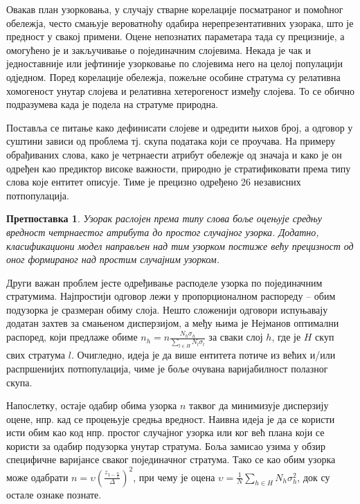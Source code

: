 \documentclass[a4paper]{article}
\newtheorem{hipoteza}{Претпоставка}
\begin{document}
Овакав план узорковања, у случају стварне корелације посматраног и помоћног обележја, често смањује вероватноћу одабира нерепрезентативних узорака, што је предност у свакој примени. Оцене непознатих параметара тада су прецизније, а омогућено је и закључивање о појединачним слојевима. Некада је чак и једноставније или јефтиније узорковање по слојевима него на целој популацији одједном. Поред корелације обележја, пожељне особине стратума су релативна хомогеност унутар слојева и релативна хетерогеност између слојева. То се обично подразумева када је подела на стратуме природна.

Поставља се питање како дефинисати слојеве и одредити њихов број, а одговор у суштини зависи од проблема тј. скупа података који се проучава. На примеру обрађиваних слова, како је четрнаести атрибут обележје од значаја и како је он одређен као предиктор високе важности, природно је стратификовати према типу слова које ентитет описује. Тиме је прецизно одређено 26 независних потпопулација.

\begin{hipoteza}
Узорак раслојен према типу слова боље оцењује средњу вредност четрнаестог атрибута до простог случајног узорка. Додатно, класификациони модел направљен над тим узорком постиже већу прецизност од оног формираног над простим случајним узорком.
\end{hipoteza}

Други важан проблем јесте одређивање расподеле узорка по појединачним стратумима. Најпростији одговор лежи у пропорционалном распореду -- обим подузорка је сразмеран обиму слоја. Нешто сложенији одговори испуњавају додатан захтев за смањеном дисперзијом, а међу њима је Нејманов оптимални распоред, који предлаже обиме $n_h = n \frac{N_h \sigma_h}{\sum_{l \in H} N_l \sigma_l}$ за сваки слој $h$, где је $H$ скуп свих стратума $l$. Очигледно, идеја је да више ентитета потиче из већих и/или распршенијих потпопулација, чиме је боље очувана варијабилност полазног скупа.

Напослетку, остаје одабир обима узорка $n$ таквог да минимизује дисперзију оцене, нпр. кад се процењује средња вредност. Наивна идеја је да се користи исти обим као код нпр. простог случајног узорка или ког већ плана који се користи за одабир подузорка унутар стратума. Боља замисао узима у обзир специфичне варијансе сваког појединачног стратума. Тако се као обим узорка може одабрати $n = \upsilon (\frac{z_{1-\frac{\alpha}{2}}}{\Delta})^2$, при чему је оцена $\upsilon = \frac{1}{N} \sum_{h \in H} N_h \sigma_h^2$, док су остале ознаке познате.
\end{document}
